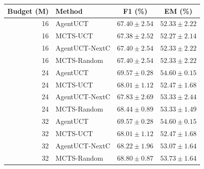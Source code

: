 \begin{tabular}{rlcc}
\toprule
Budget (M) & Method & F1 (\%) & EM (\%) \\
\midrule
16 & AgentUCT & $67.40 \pm 2.54$ & $52.33 \pm 2.22$ \\
16 & MCTS-UCT & $67.38 \pm 2.52$ & $52.27 \pm 2.14$ \\
16 & AgentUCT-NextC & $67.40 \pm 2.54$ & $52.33 \pm 2.22$ \\
16 & MCTS-Random & $67.40 \pm 2.54$ & $52.33 \pm 2.22$ \\
24 & AgentUCT & $69.57 \pm 0.28$ & $54.60 \pm 0.15$ \\
24 & MCTS-UCT & $68.01 \pm 1.12$ & $52.47 \pm 1.68$ \\
24 & AgentUCT-NextC & $67.83 \pm 2.69$ & $53.33 \pm 2.44$ \\
24 & MCTS-Random & $68.44 \pm 0.89$ & $53.33 \pm 1.49$ \\
32 & AgentUCT & $69.57 \pm 0.28$ & $54.60 \pm 0.15$ \\
32 & MCTS-UCT & $68.01 \pm 1.12$ & $52.47 \pm 1.68$ \\
32 & AgentUCT-NextC & $68.22 \pm 1.96$ & $53.07 \pm 1.64$ \\
32 & MCTS-Random & $68.80 \pm 0.87$ & $53.73 \pm 1.64$ \\
\bottomrule
\end{tabular}
